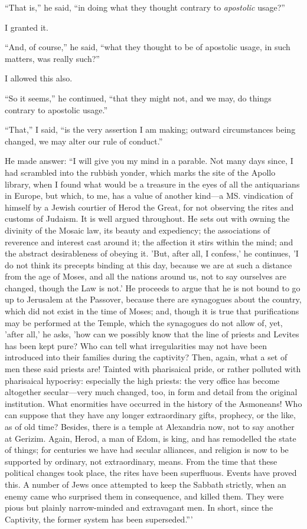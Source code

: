 ``That is,'' he said, ``in doing what they thought
contrary to \emph{apostolic} usage?''

I granted it.

``And, of course,'' he said, ``what they thought to
be of apostolic usage, in such matters, was really such?''

I allowed this also.

``So it seems,'' he continued, ``that they might
not, and we may, do things contrary to apostolic usage.''

``That,'' I said, ``is the very assertion I am
making; outward circumstances being changed, we may alter our rule of
conduct.''

He made answer: ``I will give you my mind in a
parable. Not many days since, I had scrambled into the rubbish yonder,
which marks the site of the Apollo library, when I found what would be
a treasure in the eyes of all the antiquarians in Europe, but which,
to me, has a value of another kind—a MS. vindication of himself by a
Jewish courtier of Herod the Great, for not observing the rites and
customs of Judaism. It is well argued throughout. He sets out with
owning the divinity of the Mosaic law, its beauty and expediency; the
associations of reverence and interest cast around it; the affection
it stirs within the mind; and the abstract desirableness of obeying
it. 'But, after all, I confess,' he continues, 'I do not think its
precepts binding at this day, because we are at such a distance from
the age of Moses, and all the nations around us, not to say ourselves
are changed, though the Law is not.' He proceeds to argue that he is
not bound to go up to Jerusalem at the Passover, because there are
synagogues about the country, which did not exist in the time of
Moses; and, though it is true that purifications may be performed at
the Temple, which the synagogues do not allow of, yet, 'after all,' he
asks, 'how can we possibly know that the line of priests and Levites
has been kept pure? Who can tell what irregularities may not have been
introduced into their families during the captivity? Then, again, what a set of men these said priests are! Tainted with pharisaical
pride, or rather polluted with pharisaical hypocrisy: especially the
high priests: the very office has become altogether secular—very
much changed, too, in form and detail from the original institution.
What enormities have occurred in the history of the Asmoneans! Who can
suppose that they have any longer extraordinary gifts, prophecy, or
the like, as of old time? Besides, there is a temple at Alexandria
now, not to say another at Gerizim. Again, Herod, a man of Edom, is
king, and has remodelled the state of things; for centuries we have
had secular alliances, and religion is now to be supported by
ordinary, not extraordinary, means. From the time that these political
changes took place, the rites have been superfluous. Events have
proved this. A number of Jews once attempted to keep the Sabbath
strictly, when an enemy came who surprised them in consequence, and
killed them. They were pious but plainly narrow-minded and extravagant
men. In short, since the Captivity, the former system has been
superseded.'''

